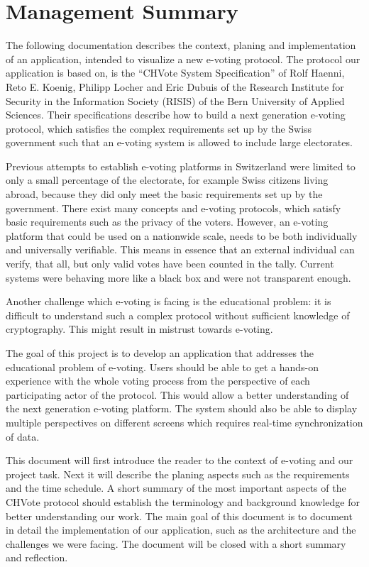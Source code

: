 \chapter*{Management Summary}
The following documentation describes the context, planing and implementation of an application, intended to visualize a new e-voting protocol. The protocol our application is based on, is the "`CHVote System Specification"' of Rolf Haenni, Reto E. Koenig, Philipp Locher and Eric Dubuis of the Research Institute for Security in the Information Society (RISIS) of the Bern University of Applied Sciences. Their specifications describe how to build a next generation e-voting protocol, which satisfies the complex requirements set up by the Swiss government such that an e-voting system is allowed to include large electorates.

Previous attempts to establish e-voting platforms in Switzerland were limited to only a small percentage of the electorate, for example Swiss citizens living abroad, because they did only meet the basic requirements set up by the government. There exist many concepts and e-voting protocols, which satisfy basic requirements such as the privacy of the voters. However, an e-voting platform that could be used on a nationwide scale, needs to be both individually and universally verifiable. This means in essence that an external individual can verify, that all, but only valid votes have been counted in the tally. Current systems were behaving more like a black box and were not transparent enough.

Another challenge which e-voting is facing is the educational problem: it is difficult to understand such a complex protocol without sufficient knowledge of cryptography. This might result in mistrust towards e-voting.

The goal of this project is to develop an application that addresses the educational problem of e-voting. Users should be able to get a hands-on experience with the whole voting process from the perspective of each participating actor of the protocol. This would allow a better understanding of the next generation e-voting platform. The system should also be able to display multiple perspectives on different screens which requires real-time synchronization of data.

This document will first introduce the reader to the context of e-voting and our project task. Next it will describe the planing aspects such as the requirements and the time schedule. A short summary of the most important aspects of the CHVote protocol should establish the terminology and background knowledge for better understanding our work. The main goal of this document is to document in detail the implementation of our application, such as the architecture and the challenges we were facing. The document will be closed with a short summary and reflection.
